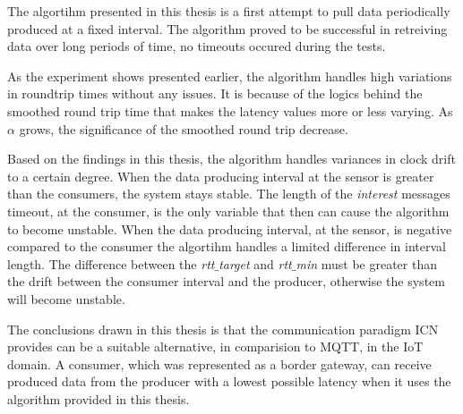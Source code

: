 The algortihm presented in this thesis is a first attempt to pull data periodically produced at a fixed interval. The algorithm proved to be successful in retreiving data over long periods of time, no timeouts occured during the tests. %

As the experiment shows presented earlier, the algorithm handles high variations in roundtrip times without any issues. It is because of the logics behind the smoothed round trip time that makes the latency values more or less varying. As $\alpha$ grows, the significance of the smoothed round trip decrease. 

Based on the findings in this thesis, the algorithm handles variances in clock drift to a certain degree. When the data producing interval at the sensor is greater than the consumers, the system stays stable. The length of the \textit{interest} messages timeout, at the consumer, is the only variable that then can cause the algorithm to become unstable. When the data producing interval, at the sensor, is negative compared to the consumer the algortihm handles a limited difference in interval length. The difference between the \textit{rtt$\_$target} and \textit{rtt$\_$min} must be greater than the drift between the consumer interval and the producer, otherwise the system will become unstable.

The conclusions drawn in this thesis is that the communication paradigm ICN provides can be a suitable alternative, in comparision to MQTT, in the IoT domain. A consumer, which was represented as a border gateway, can receive produced data from the producer with a lowest possible latency when it uses the algorithm provided in this thesis. 





